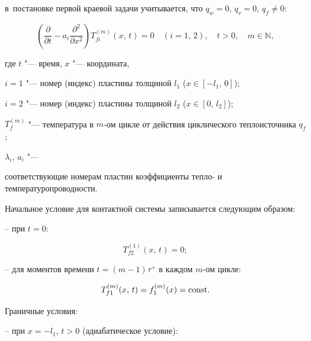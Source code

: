 в~постановке первой краевой задачи учитывается, что $q_w = 0$, $q_v = 0$, $q_f \ne 0$:

\begin{equation}

\label{evdok:eq1}

\left( {\frac{\partial }{\partial t} - a_i \frac{\partial ^2}{\partial x^2}} 

\right)T_{fi}^{(m)} (x,\,t) = 0

\quad (i = 1,\, 2),

\quad t > 0,

\quad m \in \mathbb N,

\end{equation}

где  $t$ "--- время, $x$ "--- координата, 

$i =1$ "--- номер (индекс) пластины толщиной $l_{1}$  ($x \in [ - l_1,\,0]$);

$i =2$ "--- номер (индекс) пластины толщиной $l_{2}$  ($x \in [0,\, l_2 ]$);

$T_f^{(m)} $ "--- температура в $m$-ом цикле от действия циклического теплоисточника $q_f$; 

$\lambda_i$, $a_i$ "---

соответствующие номерам пластин коэффициенты тепло- и температуропроводности. 



Начальное условие для контактной системы записывается следующим образом:



-- при $t = 0$:

\begin{equation}

T_{f2}^{(1)} (x,\,t) = 0;

\end{equation}



-- для моментов времени $t = (m - 1)\tau ^ + $ в каждом  $m$-ом цикле:

\begin{equation}

T_{f1}^{(m)} (x,\,t) = f_1^{(m)} (x) = \rm const.

\end{equation}





\noindent

Граничные условия:



-- при $x = - l_1$, $t > 0$ (адиабатическое условие):

